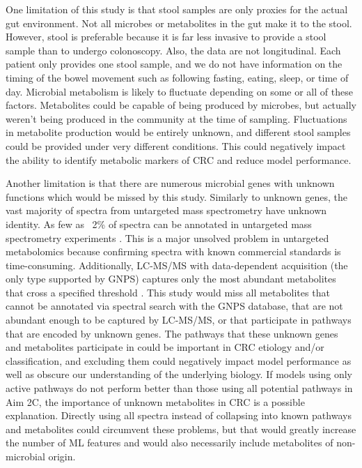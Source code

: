 \documentclass[11pt]{article}
\begin{document}
One limitation of this study is that stool samples are only proxies for the actual gut environment.
Not all microbes or metabolites in the gut make it to the stool.
However, stool is preferable because it is far less invasive to provide a stool sample than to undergo colonoscopy.
Also, the data are not longitudinal.
Each patient only provides one stool sample, and we do not have information on the timing of the bowel movement such as following fasting, eating, sleep, or time of day.
Microbial metabolism is likely to fluctuate depending on some or all of these factors.
Metabolites could be capable of being produced by microbes, but actually weren't being produced in the community at the time of sampling.
Fluctuations in metabolite production would be entirely unknown, and different stool samples could be provided under very different conditions.
This could negatively impact the ability to identify metabolic markers of CRC and reduce model performance.

Another limitation is that there are numerous microbial genes with unknown functions which would be missed by this study.
Similarly to unknown genes, the vast majority of spectra from untargeted mass spectrometry have unknown identity.
As few as ~2\% of spectra can be annotated in untargeted mass spectrometry experiments \cite{da_silva_illuminating_2015}.
This is a major unsolved problem in untargeted metabolomics because confirming spectra with known commercial standards is time-consuming.
Additionally, LC-MS/MS with data-dependent acquisition (the only type supported by GNPS) captures only the most abundant metabolites that cross a specified threshold \cite{xiao_metabolite_2012}.
This study would miss all metabolites that cannot be annotated via spectral search with the GNPS database, that are not abundant enough to be captured by LC-MS/MS, or that participate in pathways that are encoded by unknown genes.
The pathways that these unknown genes and metabolites participate in could be important in CRC etiology and/or classification,
and excluding them could negatively impact model performance as well as obscure our understanding of the underlying biology.
If models using only active pathways do not perform better than those using all potential pathways in Aim 2C,
the importance of unknown metabolites in CRC is a possible explanation.
Directly using all spectra instead of collapsing into known pathways and metabolites could circumvent these problems,
but that would greatly increase the number of ML features and would also necessarily include metabolites of non-microbial origin.
\end{document}
